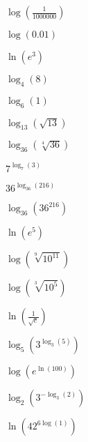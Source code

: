 \documentclass{ximera}
\begin{document}
\begin{question}
\begin{problem}
$\log \left(\frac{1}{1000000}\right)$
\end{problem}

\begin{problem}
$\log(0.01)$
\end{problem}

\begin{problem}
$\ln\left(e^3\right)$
\end{problem}

\begin{problem}
$\log_{4} (8)$
\end{problem}

\begin{problem}
$\log_{6} (1)$
\end{problem}

\begin{problem}
$\log_{13} \left(\sqrt{13}\right)$
\end{problem}

\begin{problem}
$\log_{36} \left(\sqrt[4]{36}\right)$
\end{problem}

\begin{problem}
$7^{\log_{7} (3)}$
\end{problem}

\begin{problem}
$36^{\log_{36}(216)}$
\end{problem}

\begin{problem}
$\log_{36} \left(36^{216}\right)$
\end{problem}

\begin{problem}
$\ln \left(e^{5} \right)$
\end{problem}

\begin{problem}
$\log \left(\sqrt[9]{10^{11}}\right)$
\end{problem}

\begin{problem}
$\log\left( \sqrt[3]{10^5} \right)$
\end{problem}

\begin{problem}
$\ln \left( \frac{1}{\sqrt{e}}\right)$
\end{problem}

\begin{problem}
$\log_{5} \left(3^{\log_{3} (5)}\right)$
\end{problem}

\begin{problem}
$\log\left(e^{\ln(100)}\right)$
\end{problem}

\begin{problem}
$\log_{2}\left(3^{-\log_{3}(2)}\right)$
\end{problem}

\begin{problem}\label{simplifyloglast}
$\ln\left(42^{6\log(1)}\right)$
\end{problem}
\end{question}
\end{document}
